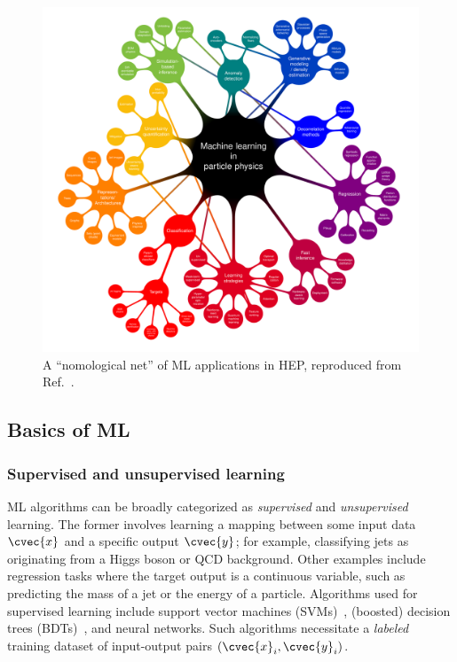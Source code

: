 \begin{figure}[ht!]
    \centering
    \includegraphics[width=\textwidth]{figures/03-ML/nomological_net}
    \caption{A ``nomological net'' of ML applications in HEP, reproduced from Ref.~\cite{lincoln2024instrumentation}.}
    \label{fig:03_ml_nomological_net}
\end{figure}

\subsection{Basics of ML}
\label{sec:03_ml_basics}

\subsubsection{Supervised and unsupervised learning}

ML algorithms can be broadly categorized as \textit{supervised} and \textit{unsupervised} learning.
The former involves learning a mapping between some input data ${\cvec{x}}$ and a specific output $\cvec{y}$; for example, classifying jets as originating from a Higgs boson or QCD background.
Other examples include regression tasks where the target output is a continuous variable, such as predicting the mass of a jet or the energy of a particle.
Algorithms used for supervised learning include support vector machines (SVMs)~\cite{cortes1995support}, (boosted) decision trees (BDTs)~\cite{breiman1984classification, hastie2009boosting}, and neural networks.
Such algorithms necessitate a \textit{labeled} training dataset of input-output pairs $(\cvec{x}_i, \cvec{y}_i)$.

